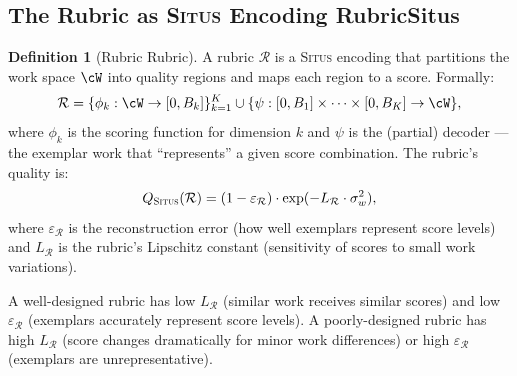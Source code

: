 \documentclass[11pt,a4paper]{article}
\theoremstyle{definition}
\newtheorem{definition}[theorem]{Definition}
\theoremstyle{remark}
\newcommand{\Situs}{\textsc{Situs}}
\newcommand{\cR}{\mathcal{R}}
\newcommand{\rubric}{\cR}
\begin{document}
\subsection{The Rubric as \Situs{} Encoding RubricSitus}
\begin{definition}[Rubric Rubric]
\label{def:rubric}
A rubric $\rubric$ is a \Situs{} encoding that partitions the work space $\cW$ into quality regions and maps each region to a score. Formally:
\begin{equation}
    \rubric = \{\phi_k: \cW \to [0, B_k]\}_{k=1}^K \cup \{\psi: [0, B_1] \times \cdots \times [0, B_K] \to \cW\},
\end{equation}
where $\phi_k$ is the scoring function for dimension $k$ and $\psi$ is the (partial) decoder — the exemplar work that ``represents'' a given score combination. The rubric's quality is:
\begin{equation}
    Q_{\Situs}(\rubric) = (1 - \varepsilon_\rubric) \cdot \exp(-L_\rubric \cdot \sigma_w^2),
\end{equation}
where $\varepsilon_\rubric$ is the reconstruction error (how well exemplars represent score levels) and $L_\rubric$ is the rubric's Lipschitz constant (sensitivity of scores to small work variations).
\end{definition}
A well-designed rubric has low $L_\rubric$ (similar work receives similar scores) and low $\varepsilon_\rubric$ (exemplars accurately represent score levels). A poorly-designed rubric has high $L_\rubric$ (score changes dramatically for minor work differences) or high $\varepsilon_\rubric$ (exemplars are unrepresentative).
\end{document}
